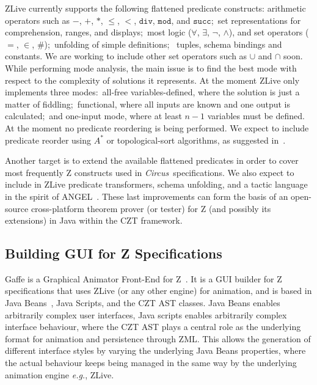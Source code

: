 \documentclass{llncs}
\newcommand{\Circus}{{\sf\slshape Circus}}
\begin{document}
    ZLive currently supports the following flattened predicate constructs: arithmetic operators
    such as $-$, $+$, $*$, $\leq$, $<$, $\mathtt{div}$, $\mathtt{mod}$, and $\mathtt{succ}$;~set
    representations for comprehension, ranges, and displays;~most logic ($\forall$,
    $\exists$, $\lnot$, $\land$), and set operators ($=$, $\in$, $\#$);~unfolding of simple
    definitions; ~tuples, schema bindings and constants.
    We are working to include other set operators such as $\cup$ and $\cap$ soon.
    While performing mode analysis, the main issue is to find the best mode with respect to
    the complexity of solutions it represents. At the moment ZLive only implements three modes:~all-free
    variables-defined, where the solution is just a matter of fiddling;~functional, where all inputs are known
    and one output is calculated;~and one-input mode, where at least $n-1$ variables must be defined.
    At the moment no predicate reordering is being performed.
    We expect to include predicate reorder using $A^*$ or topological-sort algorithms,
    as suggested in~\cite{winikooff98}.

    Another target is to extend the available flattened predicates in order to cover most
    frequently Z constructs used in \Circus\ specifications.
    We also expect to include in ZLive predicate transformers, schema unfolding, and a
    tactic language in the spirit of ANGEL~\cite{z.others:angel}.
    These last improvements can form the basis of an open-source cross-platform
    theorem prover (or tester) for Z (and possibly its extensions) in Java within
    the CZT framework.

\subsection{Building GUI for Z Specifications}

    Gaffe is a Graphical Animator Front-End for Z~\cite{daley2003}.
    It is a GUI builder for Z specifications that uses ZLive (or any other engine)
    for animation, and is based in Java Beans~\cite{javabeans}, Java Scripts, and the CZT AST classes.
    Java Beans enables arbitrarily complex user interfaces, Java scripts enables
    arbitrarily complex interface behaviour, where the CZT AST plays a central role as
    the underlying format for animation and persistence through ZML.
    This allows the generation of different interface styles by varying the underlying
    Java Beans properties, where the actual behaviour keeps being managed in the same way
    by the underlying animation engine \textit{e.g.}, ZLive.
\end{document}

